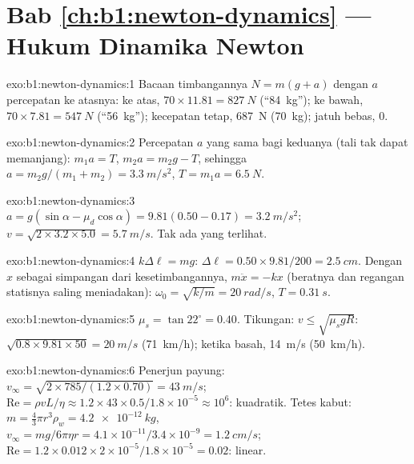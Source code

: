 \section*{Bab \ref{ch:b1:newton-dynamics} --- Hukum Dinamika Newton}

\begin{solution}{exo:b1:newton-dynamics:1}
Bacaan timbangannya $N = m(g + a)$ dengan $a$ percepatan ke atasnya: ke
atas, $70 \times 11.81 = \qty{827}{N}$ (``\qty{84}{kg}''); ke bawah, $70 \times 7.81 =
\qty{547}{N}$ (``\qty{56}{kg}''); kecepatan tetap, \qty{687}{N}
(\qty{70}{kg}); jatuh bebas, $0$.
\end{solution}

\begin{solution}{exo:b1:newton-dynamics:2}
Percepatan $a$ yang sama bagi keduanya (tali tak dapat memanjang): $m_1a = T$,
$m_2a = m_2g - T$, sehingga $a = m_2g/(m_1 + m_2) = \qty{3.3}{m/s^2}$,
$T = m_1a = \qty{6.5}{N}$.
\end{solution}

\begin{solution}{exo:b1:newton-dynamics:3}
$a = g(\sin\alpha - \mu_d\cos\alpha) = 9.81(0.50 - 0.17) = \qty{3.2}{m/s^2}$;
$v = \sqrt{2 \times 3.2 \times 5.0} = \qty{5.7}{m/s}$. Tak ada  yang terlihat.
\end{solution}

\begin{solution}{exo:b1:newton-dynamics:4}
$k\Delta\ell = mg$: $\Delta\ell = 0.50 \times 9.81/200 = \qty{2.5}{cm}$.
Dengan $x$ sebagai simpangan dari kesetimbangannya, $m\ddot x = -kx$
(beratnya dan regangan statisnya saling meniadakan): $\omega_0 = \sqrt{k/m} = \qty{20}{rad/s}$,
$T = \qty{0.31}{s}$.
\end{solution}

\begin{solution}{exo:b1:newton-dynamics:5}
$\mu_s = \tan 22^\circ = 0.40$. Tikungan: $v \leq \sqrt{\mu_sgR}$: $\sqrt{0.8
\times 9.81 \times 50} = \qty{20}{m/s}$ (\qty{71}{km/h}); ketika basah,
\qty{14}{m/s} (\qty{50}{km/h}).
\end{solution}

\begin{solution}{exo:b1:newton-dynamics:6}
Penerjun payung: $v_\infty = \sqrt{2 \times 785/(1.2 \times 0.70)} = \qty{43}{m/s}$;
$\mathrm{Re} = \rho vL/\eta \approx 1.2 \times 43 \times 0.5/1.8\times10^{-5}
\approx 10^6$: kuadratik. Tetes kabut: $m = \tfrac43\pi r^3\rho_w = \qty{4.2e-12}{kg}$,
$v_\infty = mg/6\pi\eta r = 4.1\times10^{-11}/3.4\times10^{-9} = \qty{1.2}{cm/s}$;
$\mathrm{Re} = 1.2 \times 0.012 \times 2\times10^{-5}/1.8\times10^{-5} = 0.02$:
linear.
\end{solution}

